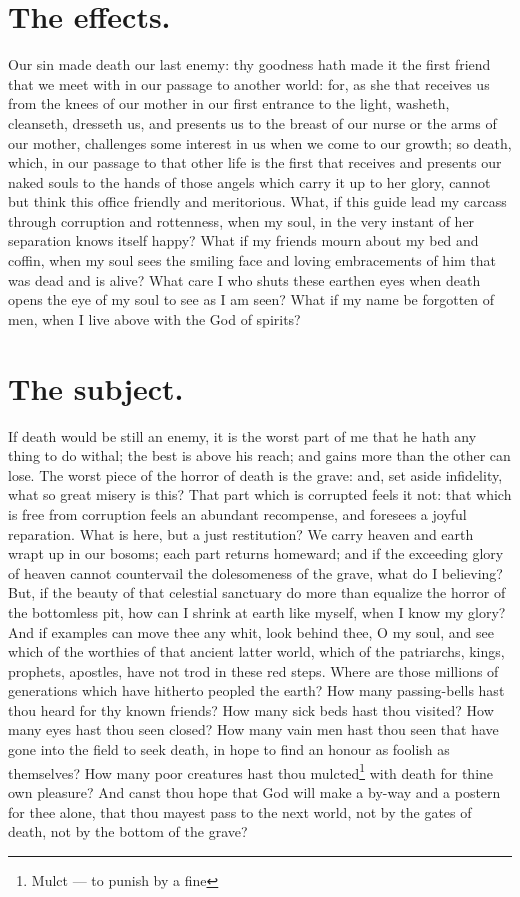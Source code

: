 \section{The effects.}
Our sin made death our last enemy: thy goodness hath made it the first friend that we meet with in our passage to another world: for, as she that receives us from the knees of our mother in our first entrance to the light, washeth, cleanseth, dresseth us, and presents us to the breast of our nurse or the arms of our mother, challenges some interest in us when we come to our growth; so death, which, in our passage to that other life is the first that receives and presents our naked souls to the hands of those angels which carry it up to her glory, cannot but think this office friendly and meritorious. What, if this guide lead my carcass through corruption and rottenness, when my soul, in the very instant of her separation knows itself happy? What if my friends mourn about my bed and coffin, when my soul sees the smiling face and loving embracements of him that was dead and is alive? What care I who shuts these earthen eyes when death opens the eye of my soul to see as I am seen? What if my name be forgotten of men, when I live above with the God of spirits? 

\section{The subject.}
If death would be still an enemy, it is the worst part of me that he hath any thing to do withal; the best is above his reach; and gains more than the other can lose. The worst piece of the horror of death is the grave: and, set aside infidelity, what so great misery is this? That part which is corrupted feels it not: that which is free from corruption feels an abundant recompense, and foresees a joyful reparation. What is here, but a just restitution? We carry heaven and earth wrapt up in our bosoms; each part returns homeward; and if the exceeding glory of heaven cannot countervail the dolesomeness of the grave, what do I believing? But, if the beauty of that celestial sanctuary do more than equalize the horror of the bottomless pit, how can I shrink at earth like myself, when I know my glory? And if examples can move thee any whit, look behind thee, O my soul, and see which of the worthies of that ancient latter world, which of the patriarchs, kings, prophets, apostles, have not trod in these red steps. Where are those millions of generations which have hitherto peopled the earth? How many passing-bells hast thou heard for thy known friends? How many sick beds hast thou visited? How many eyes hast thou seen closed? How many vain men hast thou seen that have gone into the field to seek death, in hope to find an honour as foolish as themselves? How many poor creatures hast thou mulcted\footnote{Mulct --- to punish by a fine} with death for thine own pleasure? And canst thou hope that God will make a by-way and a postern for thee alone, that thou mayest pass to the next world, not by the gates of death, not by the bottom of the grave? 
 
